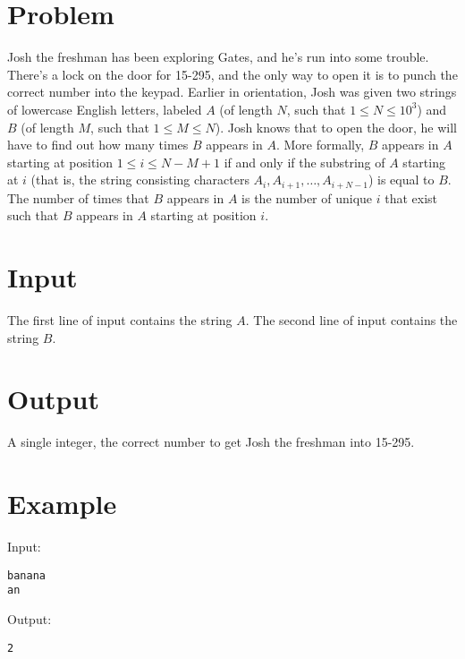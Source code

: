\documentclass[11pt]{article}
\begin{document}
\section*{Problem}
Josh the freshman has been exploring Gates, and he's run into some trouble.
There's a lock on the door for 15-295, and the only way to open it is to punch the correct number into the keypad.
Earlier in orientation, Josh was given two strings of lowercase English letters, labeled $A$ (of length $N$, such that $1 \le N \le 10^3$) and $B$ (of length $M$, such that $1 \le M \le N$).
Josh knows that to open the door, he will have to find out how many times $B$ appears in $A$.
\linebreak
\linebreak
\noindent More formally, $B$ appears in $A$ starting at position $1 \le i \le N-M+1$ if and only if the substring of $A$ starting at $i$ (that is, the string consisting characters $A_i, A_{i+1}, \hdots, A_{i+N-1}$) is equal to $B$.
The number of times that $B$ appears in $A$ is the number of unique $i$ that exist such that $B$ appears in $A$ starting at position $i$.
\section*{Input}
The first line of input contains the string $A$.
The second line of input contains the string $B$.
\section*{Output}
A single integer, the correct number to get Josh the freshman into 15-295.
\section*{Example}
Input:

\begin{verbatim}
banana
an
\end{verbatim}

\noindent Output:

\begin{verbatim}
2
\end{verbatim}
\end{document}
